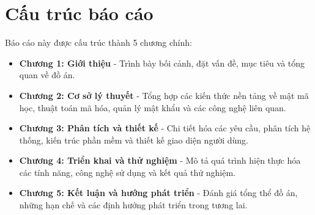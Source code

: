 \section{Cấu trúc báo cáo}
Báo cáo này được cấu trúc thành 5 chương chính:
\begin{itemize}
    \item \textbf{Chương 1: Giới thiệu} - Trình bày bối cảnh, đặt vấn đề, mục tiêu và tổng quan về đồ án.
    \item \textbf{Chương 2: Cơ sở lý thuyết} - Tổng hợp các kiến thức nền tảng về mật mã học, thuật toán mã hóa, quản lý mật khẩu và các công nghệ liên quan.
    \item \textbf{Chương 3: Phân tích và thiết kế} - Chi tiết hóa các yêu cầu, phân tích hệ thống, kiến trúc phần mềm và thiết kế giao diện người dùng.
    \item \textbf{Chương 4: Triển khai và thử nghiệm} - Mô tả quá trình hiện thực hóa các tính năng, công nghệ sử dụng và kết quả thử nghiệm.
    \item \textbf{Chương 5: Kết luận và hướng phát triển} - Đánh giá tổng thể đồ án, những hạn chế và các định hướng phát triển trong tương lai.
\end{itemize}
\newpage